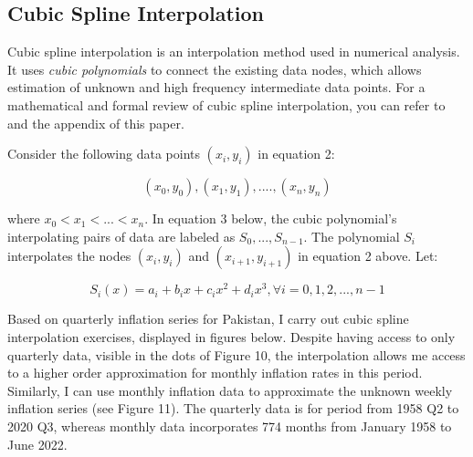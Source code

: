 \documentclass[12pt]{article}
\newcommand{\1}{\mathbbm 1}
\begin{document}
		
		
		
		\subsection{Cubic Spline Interpolation}
		
		Cubic spline interpolation is an interpolation method used in numerical analysis. It uses \textit{cubic polynomials} to connect the existing data nodes, which allows estimation of unknown and high frequency intermediate data points. For a mathematical and formal review of cubic spline interpolation, you can refer to \cite{burden2015numerical} and the appendix of this paper.
		
		Consider the following data points $(x_{i}, y_{i})$ in equation 2:
		
		\begin{equation}
			(x_{0}, y_{0}), (x_{1}, y_{1}), .... , (x_{n}, y_{n})
		\end{equation}
		
		
		where $x_{0} < x_{1} < ... < x_{n}$. In equation 3 below, the cubic polynomial's interpolating pairs of data are labeled as $S_{0},..., S_{n-1}$. The polynomial $S_{i}$ interpolates the nodes $(x_{i}, y_{i})$ and $(x_{i+1}, y_{i+1})$ in equation 2 above. Let:
		
		
		\begin{equation}
			S_{i}(x) = a_{i} + b_{i}x + c_{i}x^{2} + d_{i}x^{3}, \forall i = 0, 1, 2, ... ,n-1
		\end{equation}
		
		
		
		
		
		
		Based on quarterly inflation series for Pakistan, I carry out cubic spline interpolation exercises, displayed in figures  below. Despite having access to only quarterly data, visible in the dots of Figure 10, the interpolation allows me access to a higher order approximation for monthly inflation rates in this period. Similarly, I can use monthly inflation data  to approximate the unknown weekly inflation series (see Figure 11). The quarterly data is for period from 1958 Q2 to 2020 Q3, whereas monthly data incorporates 774 months from January 1958 to June 2022.
		
\end{document}
